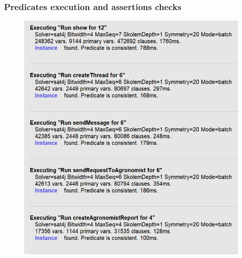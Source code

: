 \subsubsection{Predicates execution and assertions checks}
\begin{figure}[H]
\centering
\includegraphics[scale=0.4]{../AlloyCode/executionImages/execution_short1.png}
\end{figure}

